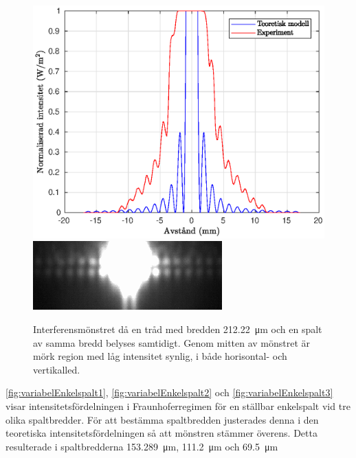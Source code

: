 \documentclass[a4paper]{article}
\begin{document}
\begin{figure}[h!]
	\centering
	\includegraphics[width=0.75\linewidth]{Data/Figurer/trad+enkelspalt.eps}
	\includegraphics[width=0.5\linewidth]{Data/Figurer/trad+enkelspalt.png}
	\caption{Interferensmönstret då en tråd med bredden \SI{212.22}{\micro\m} och en spalt av samma bredd belyses samtidigt. Genom mitten av mönstret är mörk region med låg intensitet synlig, i både horisontal- och vertikalled.}
	\label{fig:trad+enkelspalt}
\end{figure}

\FloatBarrier

\autoref{fig:variabelEnkelspalt1}, \autoref{fig:variabelEnkelspalt2} och \autoref{fig:variabelEnkelspalt3} visar intensitetsfördelningen i Fraunhoferregimen för en ställbar enkelspalt vid tre olika spaltbredder. För att bestämma spaltbredden justerades denna i den teoretiska intensitetsfördelningen så att mönstren stämmer överens. Detta resulterade i spaltbredderna \SI{153.289}{\micro\m}, \SI{111.2}{\micro\m} och \SI{69.5}{\micro\m}

\FloatBarrier
\end{document}
